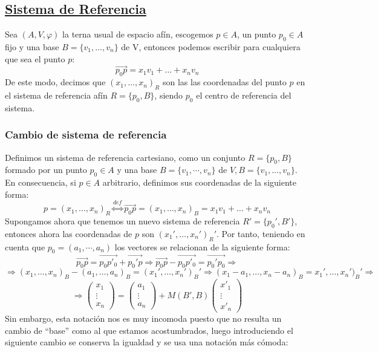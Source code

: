 \documentclass[10pt,a4paper,openright]{book}
\begin{document}
\subsection*{\underline{Sistema de Referencia}}
Sea $(A, V, \varphi)$ la terna usual de espacio afín, escogemos $p \in A$, un punto $p_0 \in A $ fijo y una base $B=\{v_1, \ldots, v_n\}$ de V, entonces podemos escribir para cualquiera que sea el punto $p$:
$$\vec{p_0p} = x_1 v_1 + \ldots + x_n v_n$$
De este modo, decimos que $(x_1, \ldots, x_n)_R$ son las las coordenadas del punto $p$ en el sistema de referencia afín $R = \{p_0 , B\}$, siendo $p_0$ el centro de referencia del sistema.

\subsubsection*{Cambio de sistema de referencia}
Definimos un sistema de referencia cartesiano, como un conjunto $R = \{p_0, B\}$ formado por un punto $p_0 \in A$ y una base $B=\{v_1, \cdots, v_n\}$ de $V, B=\{v_1, \ldots, v_n\}$.
En consecuencia, si $p\in A$ arbitrario, definimos sus coordenadas de la siguiente forma:
$$p=(x_1, \ldots, x_n)_R \overset{def}{\Leftrightarrow} \vec{p_0 p} = (x_1, \ldots, x_n)_B = x_1v_1 + \ldots + x_n v_n$$
Supongamos ahora que tenemos un nuevo sistema de referencia $R' = \{p_0', B'\}$, entonces ahora las coordenadas de $p$ son $(x_1', \ldots, x_n')_R'$. Por tanto, teniendo en cuenta que $p_0=(a_1, \cdots , a_n)$ los vectores se relacionan de la siguiente forma:
$$\vec{p_0 p} = \vec{p_0 p'_0} + \vec{p_0' p} \Rightarrow  \vec{p_0 p} -\vec{p_0 p'_0}  =  \vec{p_0'p_0} \Rightarrow$$
$$\Rightarrow (x_1, \ldots, x_n)_B  -(a_1, \ldots, a_n)_B = (x_1', \ldots, x_n')_B' \Rightarrow (x_1 - a_1,  \ldots, x_n - a_n)_B = x_1', \ldots, x_n')_B' \Rightarrow $$
$$\Rightarrow \begin{pmatrix}
x_1 \\ \vdots \\ x_n
\end{pmatrix} =\begin{pmatrix}
a_1 \\ \vdots \\ a_n
\end{pmatrix} + M(B',B)\begin{pmatrix}
x'_1 \\ \vdots \\ x'_n
\end{pmatrix} $$
Sin embargo, esta notación nos es muy incomoda puesto que no resulta un cambio de ``base'' como al que estamos acostumbrados, luego introduciendo el siguiente cambio se conserva la igualdad y se usa una notación más cómoda:
\end{document}
